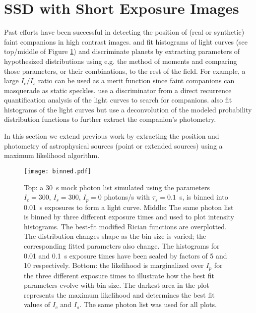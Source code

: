 \documentclass[../main.tex]{subfiles}
\begin{document}
\section{SSD with Short Exposure Images} \label{sec:binned}

Past efforts have been successful in detecting the position of (real or synthetic) faint companions in high contrast images. \textcite{Gladysz_2008} and \textcite{Meeker2018} fit histograms of light curves (see top/middle of Figure \ref{fig:SSD_bin}) and discriminate planets by extracting parameters of hypothesized distributions using e.g. the method of moments and comparing those parameters, or their combinations, to the rest of the field. For example, a large $I_c/I_s$ ratio can be used as a merit function since faint companions can masquerade as static speckles. \textcite{Stangalini_2018} use a discriminator from a direct recurrence quantification analysis of the light curves to search for companions. \textcite{Gladysz_2009, Gladysz_2010} also fit histograms of the light curves but use a deconvolution of the modeled probability distribution functions to further extract the companion's photometry.

In this section we extend previous work by  extracting the position and photometry of astrophysical sources (point or extended sources) using a maximum likelihood algorithm.

\begin{figure}
    \centering
    \texttt{[image: binned.pdf]}
    \caption[Simulating lightcurves and calculating the most likely $I_c$ and $I_s$]{Top: a 30~s mock photon list simulated using the parameters $I_c = 300$, $I_s = 300$, $I_p = 0$ photons/s with $\tau_s=0.1$~s, is binned into 0.01~s exposures to form a light curve. Middle: The same photon list is binned by three different exposure times and used to plot intensity histograms. The best-fit modified Rician functions are overplotted. The distribution changes shape as the bin size is varied; the corresponding fitted parameters also change. The histograms for 0.01 and 0.1~s exposure times have been scaled by factors of 5 and 10 respectively. Bottom: the likelihood is marginalized over $I_p$ for the three different exposure times to illustrate how the best fit parameters evolve with bin size. The darkest area in the plot represents the maximum likelihood and determines the best fit values of $I_c$ and $I_s$. The same photon list was used for all plots. }
    \label{fig:SSD_bin}
\end{figure}
\end{document}
